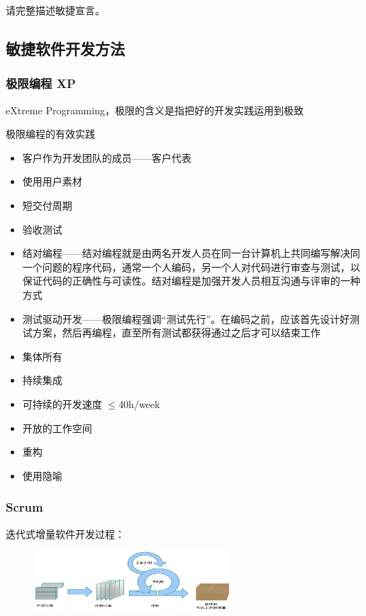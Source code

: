 \begin{problem}
请完整描述敏捷宣言。
\end{problem}

\subsection{敏捷软件开发方法}
\subsubsection{极限编程 XP}
eXtreme Programming，极限的含义是指把好的开发实践运用到极致

极限编程的有效实践
\vspace{-0.8em}
\begin{multicols}{2}
    \begin{itemize}
        \item 客户作为开发团队的成员——客户代表
        \item 使用用户素材
        \item 短交付周期
        \item 验收测试
        \item 结对编程——结对编程就是由两名开发人员在同一台计算机上共同编写解决同一个问题的程序代码，通常一个人编码，另一个人对代码进行审查与测试，以保证代码的正确性与可读性。结对编程是加强开发人员相互沟通与评审的一种方式
        \item 测试驱动开发——极限编程强调“测试先行”。在编码之前，应该首先设计好测试方案，然后再编程，直至所有测试都获得通过之后才可以结束工作
        \item 集体所有
        \item 持续集成
        \item 可持续的开发速度 $\leq$40h/week
        \item 开放的工作空间
        \item 重构
        \item 使用隐喻
    \end{itemize}
\end{multicols}
\vspace{-1em}

\subsubsection{Scrum}
迭代式增量软件开发过程：
\begin{figure}[H]
    \vspace{-0.5em}
	\centering
	\includegraphics[width=0.65\textwidth]{images/Scrum.png}
    \vspace{-1em}
\end{figure}

